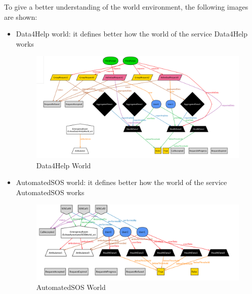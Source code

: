 To give a better understanding of the world environment, the following images are shown:
\begin{itemize}
\item Data4Help world: it defines better how the world of the service Data4Help works
\begin{figure}[H]
\includegraphics[width=\linewidth]{Images/world1}
\caption{ Data4Help World }
\label{fig:world1}
\end{figure}

\item AutomatedSOS world: it defines better how the world of the service AutomatedSOS works
\begin{figure}[H]
\includegraphics[width=\linewidth]{Images/world2}
\caption{ AutomatedSOS World }
\label{fig:world2}
\end{figure}
 

\end{itemize}